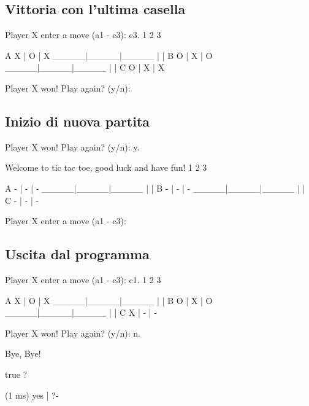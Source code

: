 \documentclass{article}
\begin{document}
\subsection{Vittoria con l'ultima casella}
    \begin{spverbatim}
    Player X enter a move (a1 - c3): c3.
         1     2     3

    A    X  |  O  |  X  
       _____|_____|_____
            |     |     
    B    O  |  X  |  O  
       _____|_____|_____
            |     |     
    C    O  |  X  |  X  

    Player X won!
    Play again? (y/n): 
    \end{spverbatim}

\subsection{Inizio di nuova partita}
    \begin{spverbatim}
    Player X won!
    Play again? (y/n): y.

    Welcome to tic tac toe, good luck and have fun!
         1     2     3

    A    -  |  -  |  -  
       _____|_____|_____
            |     |     
    B    -  |  -  |  -  
       _____|_____|_____
            |     |     
    C    -  |  -  |  -  

    Player X enter a move (a1 - c3): 
    \end{spverbatim}

\subsection{Uscita dal programma}
    \begin{spverbatim}
    Player X enter a move (a1 - c3): c1.
         1     2     3

    A    X  |  O  |  X  
       _____|_____|_____
            |     |     
    B    O  |  X  |  O  
       _____|_____|_____
            |     |     
    C    X  |  -  |  -  

    Player X won!
    Play again? (y/n): n.

    Bye, Bye!

    true ? 

    (1 ms) yes
    | ?- 
    \end{spverbatim}
\end{document}
